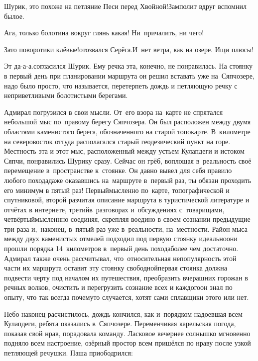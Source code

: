 \diagdash Шурик, это похоже на петляние Песи перед Хвойной!\mdash Замполит вдруг вспомнил былое.

\diagdash Ага, только болотина вокруг глянь какая! Ни~причалить, ни чего!

\diagdash Зато поворотики клёвые!\mdash отозвался Серёга.\mdash И~нет ветра, как на озере. Ищи плюсы!

\diagdash Эт да-а-а.\mdash согласился Шурик. Ему речка эта, конечно, не понравилась. На стоянку в первый день при планировании маршрута  он решил вставать уже на~Сяпчозере, надо было просто, что называется, перетерпеть дождь и петляющую речку с неприветливыми болотистыми берегами. 

Адмирал погрузился в свои мысли. От~его взора на~карте не спрятался небольшой мыс по~правому берегу Сяпчозера. Он был расположен между двумя областями каменистого берега, обозначенного на старой топокарте. В~километре на северо\sdash восток оттуда располагался старый геодезический пункт на горе. Местность эта и этот мыс, расположенный между устьем Кулапдеги и истоком Сяпчи, понравились Шурику сразу. Сейчас он грёб, воплощая в~реальность своё перемещение в~пространстве к~стоянке. Он давно вывел для себя правило любого похода\mdash даже оказавшись на~маршруте в~первый раз, ты обязан проходить его минимум в пятый раз! Первый\mdash мысленно по~карте, топографической и спутниковой, второй раз\mdash читая описание маршрута в туристической литературе и отчётах в интернете, третий\mdash в~разговорах и~обсуждениях с~товарищами, четвёртый\mdash мысленнно соединяя, скрепляя воедино в своем сознании предыдущие три раза и,~наконец, в~пятый раз уже в~реальности, на~местности. Район мыса между двух каменистых отмелей подходил под первую стоянку идеально\mdash они прошли порядка 14~километров в~первый день похода\mdash более чем достаточно. Адмирал также очень рассчитывал, что~относительная непопулярность этой части их маршрута оставит эту стоянку свободной\mdash первая стоянка должна подвести черту под началом их путешествия, преобразить вчерашних горожан в речных волков, очистить и перегрузить сознание всех и каждого\mdash он знал по опыту, что так всегда почему\sdash то случается, хотят сами сплавщики этого или нет. 

Небо наконец расчистилось, дождь кончился, как и~порядком надоевшая всем Кулапдеги, ребята оказались в~Сяпчозере. Переменчивая карельская погода, показав свой нрав, порадовала команду. Ласковое вечернее солнышко мгновенно подняло всем настроение, озёрный простор всем пришёлся по нраву после узкой петляющей речушки. Паша приободрился:

